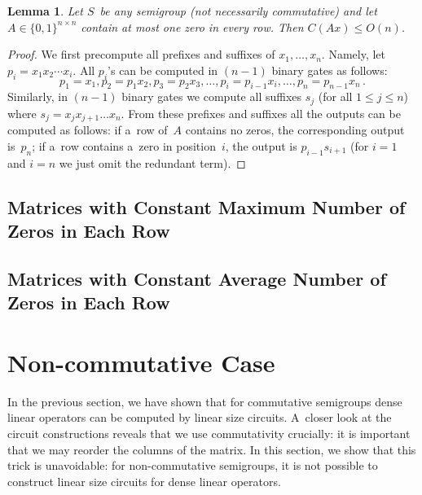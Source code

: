 \documentclass[11pt,letterpaper]{article}
\newtheorem{lemma}{Lemma}
\begin{document}
\begin{lemma}
Let $S$~be {\em any} semigroup (not necessarily commutative) and let $A \in \{0,1\}^{n \times n}$ contain at most one zero in every row. Then $C(Ax) \le O(n)$.
\end{lemma}
\begin{proof}
We first precompute all prefixes and suffixes of $x_1, \dotsc, x_n$. Namely, let $p_i=x_1x_2\dotsb x_i$. All $p_i$'s can be computed in $(n-1)$ binary gates as follows:
\[p_1=x_1, p_2=p_1x_2, p_3=p_2x_3, \dotsc, p_i=p_{i-1}x_i, \dotsc, p_n=p_{n-1}x_n \, .\]
Similarly, in $(n-1)$ binary gates we compute all suffixes $s_j$ (for all $1 \le j \le n$) where $s_j=x_jx_{j+1}\dotsc x_n$. From these prefixes and suffixes all the outputs can be computed as follows: if a~row of~$A$ contains no zeros, the corresponding output is~$p_n$; if a~row contains a~zero in position~$i$, the output is $p_{i-1}s_{i+1}$ (for $i=1$ and $i=n$ we just omit the redundant term).
\end{proof}



\subsection{Matrices with Constant Maximum Number of Zeros in Each Row}

\subsection{Matrices with Constant Average Number of Zeros in Each Row}

\section{Non-commutative Case}

In the previous section, we have shown that for commutative semigroups dense linear operators can be computed by linear size circuits. A~closer look at the circuit constructions reveals that we use commutativity crucially: it is important that we may reorder the columns of the matrix. In this section, we show that this trick is unavoidable: for non-commutative semigroups, it is not possible to construct linear size circuits for dense linear operators. 

\end{document}
